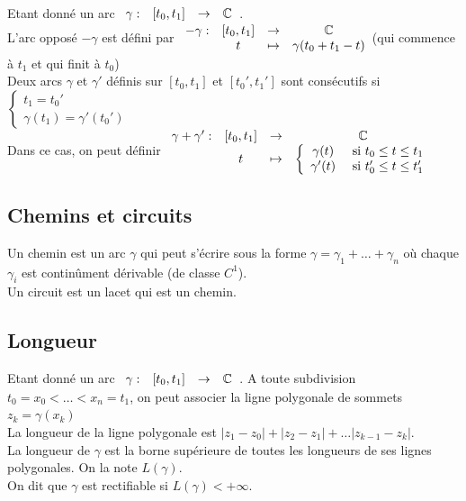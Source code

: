 \documentclass[]{report}
\begin{document}
\begin{df}
    Etant donné un arc $\begin{array}{ccccc}
\gamma : & [t_0,t_1] & \to & \mathbb{C}
\end{array}$. \\L'arc opposé $-\gamma$ est défini par $\begin{array}{ccccc}
-\gamma : & [t_0,t_1] & \to & \mathbb{C} \\
  & t & \mapsto & \gamma(t_0+t_1-t)
\end{array}$(qui commence à $t_1$ et qui finit à $t_0$)\\
Deux arcs $\gamma$ et $\gamma'$ définis sur $[t_0,t_1]$ et $[t_0',t_1']$ sont consécutifs si $\left\{\begin{array}{cc}
t_1=t_0'\\
\gamma(t_1)=\gamma'(t_0')
\end{array}\right.$\\
Dans ce cas, on peut définir $\begin{array}{ccccc}
\gamma+\gamma' : & [t_0,t_1] & \to & \mathbb{C} \\
& t & \mapsto & \left\{\begin{array}{cc}
\gamma(t)     & \text{ si } t_0 \le t \le t_1 \\
\gamma'(t)     & \text{ si } t_0' \le t \le t_1'
\end{array}\right.  
\end{array}$
\end{df}

\subsection{Chemins et circuits}

Un chemin est un arc $\gamma$ qui peut s'écrire sous la forme $\gamma=\gamma_1+\dots+\gamma_n$ où chaque $\gamma_i$ est continûment dérivable (de classe $C^1$).\\
Un circuit est un lacet qui est un chemin.

\subsection{Longueur}

    Etant donné un arc $\begin{array}{ccccc}
\gamma : & [t_0,t_1] & \to & \mathbb{C}
\end{array}$. A toute subdivision $t_0=x_0<\dots<x_n=t_1$, on peut associer la ligne polygonale de sommets $z_k=\gamma(x_k)$\\
La longueur de la ligne polygonale est $|z_1-z_0|+|z_2-z_1|+\dots|z_{k-1}-z_k|$.\\
La longueur de $\gamma$ est la borne supérieure de toutes les longueurs de ses lignes polygonales. On la note $L(\gamma)$.\\
On dit que $\gamma$ est rectifiable si $L(\gamma)<+\infty$.
\end{document}
